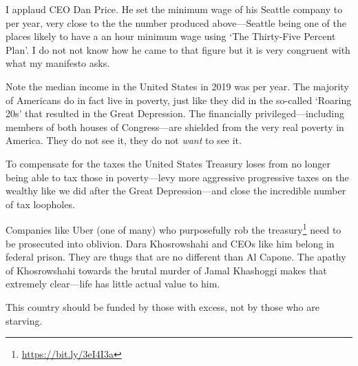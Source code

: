 I applaud CEO Dan Price. He set the minimum wage of his Seattle company to  per year, very close to the the number produced above---Seattle being one of the places likely to have a  an hour minimum wage using `The Thirty-Five Percent Plan'. I do not not know how he came to that figure but it is very congruent with what my manifesto asks.

Note the median income in the United States in 2019 was  per year. The majority of Americans do in fact live in poverty, just like they did in the so-called `Roaring 20s' that resulted in the Great Depression. The financially privileged---including members of both houses of Congress---are shielded from the very real poverty in America. They do not see it, they do not \emph{want} to see it.

To compensate for the taxes the United States Treasury loses from no longer being able to tax those in poverty---levy more aggressive progressive taxes on the wealthy like we did after the Great Depression---and close the incredible number of tax loopholes.

Companies like Uber (one of many) who purposefully rob the treasury\footnote{\url{https://bit.ly/3eI4I3a}} need to be prosecuted into oblivion. Dara Khosrowshahi and CEOs like him belong in federal prison. They are thugs that are no different than Al Capone. The apathy of Khosrowshahi towards the brutal murder of Jamal Khashoggi makes that extremely clear---life has little actual value to him.

This country should be funded by those with excess, not by those who are starving.

